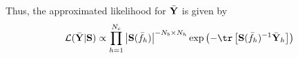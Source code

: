 \documentclass[landscape, a4paper, 11pt]{article}
\newcommand{\Y}{{\bf Y}}
\renewcommand{\S}{{\bf S}}
\renewcommand{\0}{{\bf 0}}
\begin{document}
	Thus, the approximated likelihood for $\bar{\Y}$ is given by
	\begin{align*}
		\mathcal{L}(\bar{\Y}|\S) \propto \prod_{h=1}^{N_c}\left|\S(\bar{f}_{h})\right|^{-N_b \times N_h}\exp\left(- \tr\left[ \S(\bar{f}_{h})^{-1}\bar{\Y}_{h}\right]\right)
	\end{align*}


\end{document}
